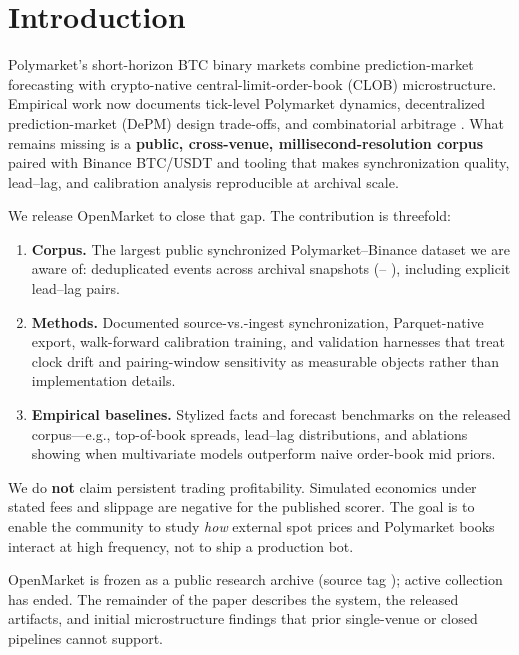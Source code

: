 \section{Introduction}
\label{sec:introduction}

Polymarket's short-horizon BTC binary markets combine prediction-market
forecasting with crypto-native central-limit-order-book (CLOB) microstructure.
Empirical work now documents tick-level Polymarket dynamics, decentralized
prediction-market (DePM) design trade-offs, and combinatorial arbitrage
\cite{dubach2026anatomy,saguillo2025arbitrage,rahman2025sok}. What remains
missing is a \textbf{public, cross-venue, millisecond-resolution corpus} paired
with Binance BTC/USDT and tooling that makes synchronization quality, lead--lag,
and calibration analysis reproducible at archival scale.

We release OpenMarket to close that gap. The contribution is threefold:
\begin{enumerate}
  \item \textbf{Corpus.} The largest public synchronized Polymarket--Binance
        dataset we are aware of: \OpenMarketTotalRows{} deduplicated events across
        \OpenMarketSnapshots{} archival snapshots (\OpenMarketCollectionStart{}--
        \OpenMarketCollectionEnd{}), including \OpenMarketLagPairs{} explicit
        lead--lag pairs.
  \item \textbf{Methods.} Documented source-vs.-ingest synchronization,
        Parquet-native export, walk-forward calibration training, and validation
        harnesses that treat clock drift and pairing-window sensitivity as
        measurable objects rather than implementation details.
  \item \textbf{Empirical baselines.} Stylized facts and forecast benchmarks on
        the released corpus---e.g., top-of-book spreads, lead--lag distributions,
        and ablations showing when multivariate models outperform naive
        order-book mid priors.
\end{enumerate}

We do \textbf{not} claim persistent trading profitability. Simulated economics
under stated fees and slippage are negative for the published scorer. The goal is
to enable the community to study \emph{how} external spot prices and Polymarket
books interact at high frequency, not to ship a production bot.

OpenMarket is frozen as a public research archive (source tag
\OpenMarketReleaseTag{}); active collection has ended. The remainder of the
paper describes the system, the released artifacts, and initial microstructure
findings that prior single-venue or closed pipelines cannot support.